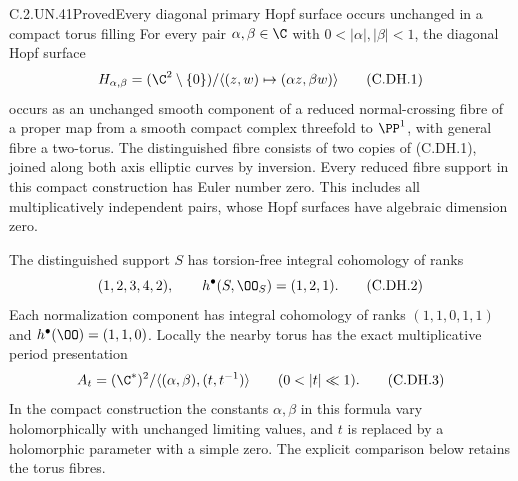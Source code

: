 \begin{statement}{C.2.UN.41}{Proved}{Every diagonal primary Hopf surface occurs unchanged in a compact torus filling}
For every pair $\alpha,\beta\in\C$ with
$0<|\alpha|,|\beta|<1$, the diagonal Hopf surface
\[
 H_{\alpha,\beta}=(\C^2\setminus\{0\})/
       \langle(z,w)\mapsto(\alpha z,\beta w)\rangle
                                                               \tag{C.DH.1}
\]
occurs as an unchanged smooth component of a
reduced normal-crossing fibre of a proper map
from a smooth compact complex threefold to
$\PP^1$, with general fibre a two-torus.
The distinguished fibre consists of two copies
of (C.DH.1), joined along both axis elliptic
curves by inversion. Every reduced fibre
support in this compact construction has
Euler number zero. This includes all
multiplicatively independent pairs, whose
Hopf surfaces have algebraic dimension zero.

The distinguished support $S$ has torsion-free
integral cohomology of ranks
\[
                  (1,2,3,4,2),\qquad
                  h^\bullet(S,\OO_S)=(1,2,1).        \tag{C.DH.2}
\]
Each normalization component has integral
cohomology of ranks $(1,1,0,1,1)$ and
$h^\bullet(\OO)=(1,1,0)$.
Locally the nearby torus has the exact
multiplicative period presentation
\[
 A_t=(\C^*)^2/
        \langle(\alpha,\beta),(t,t^{-1})\rangle
                    \qquad(0<|t|\ll1).             \tag{C.DH.3}
\]
In the compact construction the constants
$\alpha,\beta$ in this formula vary
holomorphically with unchanged limiting
values, and $t$ is replaced by a holomorphic
parameter with a simple zero. The explicit
comparison below retains the torus fibres.
\end{statement}

